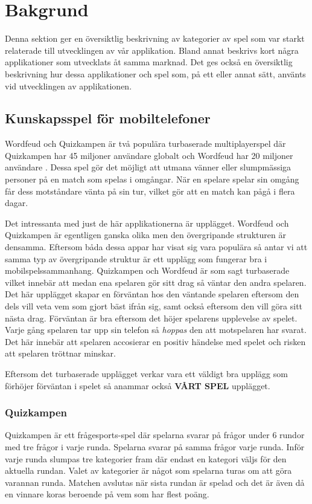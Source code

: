 \documentclass[a4paper, 11pt]{article}
\begin{document}
\section{Bakgrund}
Denna sektion ger en översiktlig beskrivning av kategorier av spel som var starkt relaterade till utvecklingen av vår applikation. Bland annat beskrivs kort några applikationer som utvecklats åt samma marknad. Det ges också en översiktlig beskrivning hur dessa applikationer och spel som, på ett eller annat sätt, använts vid utvecklingen av applikationen. 

\subsection{Kunskapsspel för mobiltelefoner}
Wordfeud och Quizkampen är två populära turbaserade multiplayerspel där Quizkampen har 45 miljoner användare globalt \cite{quiz} och Wordfeud har 20 miljoner användare \cite{wordfeud}. Dessa spel gör det möjligt att utmana vänner eller slumpmässiga personer på en match som spelas i omgångar. När en spelare spelar sin omgång får dess motståndare vänta på sin tur, vilket gör att en match kan pågå i flera dagar.

Det intressanta med just de här applikationerna är upplägget. Wordfeud och Quizkampen är egentligen ganska olika men den övergripande strukturen är densamma. Eftersom båda dessa appar har visat sig vara populära så antar vi att samma typ av övergripande struktur är ett upplägg som fungerar bra i mobilspelssammanhang. Quizkampen och Wordfeud är som sagt turbaserade vilket innebär att medan ena spelaren gör sitt drag så väntar den andra spelaren. Det här upplägget skapar en förväntan hos den väntande spelaren eftersom den dels vill veta vem som gjort bäst ifrån sig, samt också eftersom den vill göra sitt nästa drag. Förväntan är bra eftersom det höjer spelarens upplevelse av spelet. Varje gång spelaren tar upp sin telefon så \textit{hoppas} den att motspelaren har svarat. Det här innebär att spelaren accosierar en positiv händelse med spelet och risken att spelaren tröttnar minskar.

Eftersom det turbaserade upplägget verkar vara ett väldigt bra upplägg som förhöjer förväntan i spelet så anammar också \textbf{VÅRT SPEL} upplägget. 

\subsubsection{Quizkampen}
Quizkampen \cite{aboutquiz} är ett frågesports-spel där spelarna svarar på frågor under 6 rundor med tre frågor i varje runda. Spelarna svarar på samma frågor varje runda.  Inför varje runda slumpas tre kategorier fram där endast en kategori väljs för den aktuella rundan. Valet av kategorier är något som spelarna turas om att göra varannan runda. Matchen avslutas när sista rundan är spelad och det är även då en vinnare koras beroende på vem som har flest poäng. 
\end{document}
